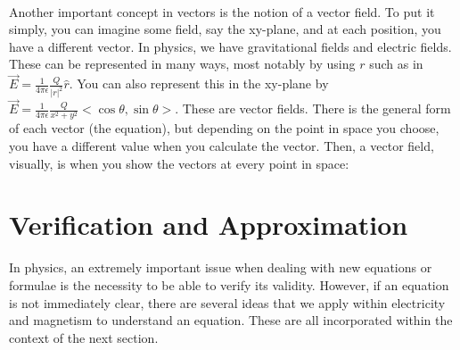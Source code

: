 \documentclass{article}
\begin{document}
\\
Another important concept in vectors is the notion of a vector field. To put it simply, you can imagine some field, say the xy-plane, and at each position, you have a different vector. In physics, we have gravitational fields and electric fields. These can be represented in many ways, most notably by using $r$ such as in $\vec{E} = \frac{1}{4\pi\epsilon}\frac{Q}{|r|^2}\hat{r}$. You can also represent this in the xy-plane by $\vec{E} = \frac{1}{4\pi\epsilon}\frac{Q}{x^2+y^2} <\cos{\theta}, \sin{\theta}>$. These are vector fields. There is the general form of each vector (the equation), but depending on the point in space you choose, you have a different value when you calculate the vector. Then, a vector field, visually, is when you show the vectors at every point in space:  

\pagebreak

\section{Verification and Approximation}
In physics, an extremely important issue when dealing with new equations or formulae is the necessity to be able to verify its validity. However, if an equation is not immediately clear, there are several ideas that we apply within electricity and magnetism to understand an equation. These are all incorporated within the context of the next section.
\end{document}
